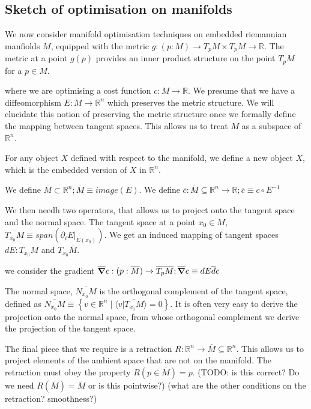 \documentclass[11pt]{book}
\begin{document}
\subsection{Sketch of optimisation on manifolds}
We now consider manifold optimisation techniques on embedded riemannian manfiolds $M$,
equipped with the metric $g: (p: M) \rightarrow T_p M  \times T_p M \rightarrow \mathbb R$.
The metric at a point $g(p)$ provides an inner product structure on the point $T_pM$
for a $p \in M$.

where we are optimising a cost function $c: M \rightarrow \mathbb R$.
We presume that we have a diffeomorphism $E: M \rightarrow \mathbb R^n$ which
preserves the metric structure. We will elucidate this notion of preserving
the metric structure once we formally define the mapping between tangent spaces.
This allows us to treat $M$ as a subspace of $\mathbb R^n$.

For any object $X$
defined with respect to the manifold, we define a new object $\overline X$, which
is the embedded version of $X$ in $\mathbb R^n$.

We define $\overline M \subset \mathbb R^n; \overline M \equiv image(E)$.
We define $\overline c: \overline M \subseteq \mathbb R^n \rightarrow \mathbb R; \overline c \equiv c \circ E^{-1}$

We then needh two operators, that allows us to project onto the tangent space
and the normal space. The tangent space at a point $x_0 \in M$, $\overline{T_{x_0} M} \equiv span(\partial_i E |_{E(x_0)})$. 
We get an induced mapping of tangent spaces $dE: T_{x_0} M$ and $T_{x_0} \overline M$.

we consider the gradient
$\overline \grad c : (p: \overline M) \rightarrow \overline{T_p M}; \overline \grad c \equiv dE \overline dc$

The normal space,
$\overline{N_{x_0} M}$ is the orthogonal complement of the tangent space, defined
as $\overline{N_{x_0} M} \equiv \left\{ v \in \mathbb R^n \mid \langle v | \overline{T_{x_0} M} \rangle = 0 \right\}$.
It is often very easy to derive the projection onto the normal space, from
whose orthogonal complement we derive the projection of the tangent space.

The final piece that we require is a retraction $R: \mathbb R^n \rightarrow \overline M \subseteq \mathbb R^n$. This allows
us to project elements of the ambient space that are not on the manifold. The
retraction must obey the property $R(p \in \overline M) = p$.
(TODO: is this correct? Do we need $R(\overline M) = \overline M$ or is this pointwise?)
(what are the other conditions on the retraction? smoothness?)
\end{document}
